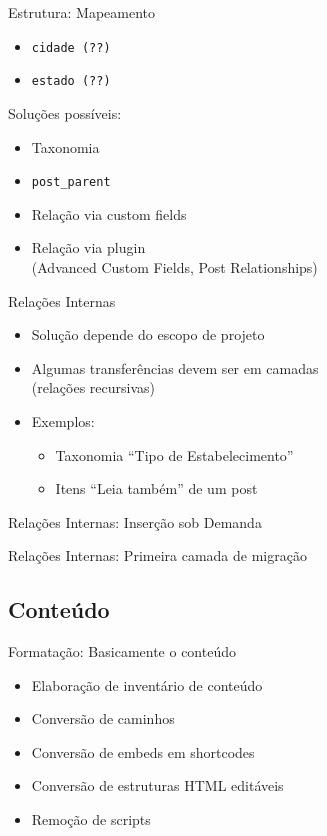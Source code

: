 \documentclass[handout]{beamer}
\begin{document}
\begin{frame}{Estrutura: Mapeamento}
  \begin{itemize}
    \item \texttt{cidade (??)}
    \item \texttt{estado (??)}
  \end{itemize}
  \pause Soluções possíveis:
  \begin{itemize}
    \item Taxonomia
    \item \texttt{post\_parent}
    \item Relação via custom fields
    \item Relação via plugin \\
          (Advanced Custom Fields, Post Relationships)
  \end{itemize}
\end{frame}

\begin{frame}{Relações Internas}
  \begin{itemize}
    \pause \item Solução depende do escopo de projeto
    \pause \item Algumas transferências devem ser em camadas \\
                 (relações recursivas)
    \pause \item Exemplos:
    \begin{itemize}
      \pause \item Taxonomia ``Tipo de Estabelecimento''
      \pause \item Itens ``Leia também'' de um post
    \end{itemize}
  \end{itemize}
\end{frame}

\begin{frame}{Relações Internas: Inserção sob Demanda}
  
\end{frame}

\begin{frame}{Relações Internas: Primeira camada de migração}
  
\end{frame}


\subsection{Conteúdo}

\begin{frame}{Formatação: Basicamente o conteúdo}
  \begin{itemize}
    \item Elaboração de inventário de conteúdo
    \item Conversão de caminhos
    \item Conversão de embeds em shortcodes
    \item Conversão de estruturas HTML editáveis
    \item Remoção de scripts
  \end{itemize}
\end{frame}
\end{document}
